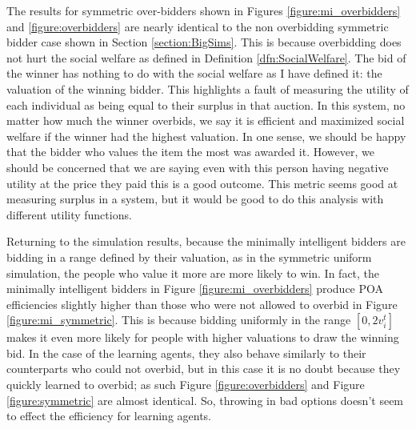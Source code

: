 \documentclass[12pt,twoside]{reedthesis}
\begin{document}
The results for symmetric over-bidders shown in Figures \ref{figure:mi_overbidders} and \ref{figure:overbidders} are nearly identical to the non overbidding symmetric bidder case shown in Section \ref{section:BigSims}. This is because overbidding does not hurt the social welfare as defined in Definition \ref{dfn:SocialWelfare}. The bid of the winner has nothing to do with the social welfare as I have defined it: the valuation of the winning bidder. This highlights a fault of measuring the utility of each individual as being equal to their surplus in that auction. In this system, no matter how much the winner overbids, we say it is efficient and maximized social welfare if the winner had the highest valuation. In one sense, we should be happy that the bidder who values the item the most was awarded it. However, we should be concerned that we are saying even with this person having negative utility at the price they paid this is a good outcome. This metric seems good at measuring surplus in a system, but it would be good to do this analysis with different utility functions. 

Returning to the simulation results, because the minimally intelligent bidders are bidding in a range defined by their valuation, as in the symmetric uniform simulation, the people who value it more are more likely to win. In fact, the minimally intelligent bidders in Figure \ref{figure:mi_overbidders} produce POA efficiencies slightly higher than those who were not allowed to overbid in Figure \ref{figure:mi_symmetric}. This is because bidding uniformly in the range $[0, 2v_i^t]$ makes it even more likely for people with higher valuations to draw the winning bid. In the case of the learning agents, they also behave similarly to their counterparts who could not overbid, but in this case it is no doubt because they quickly learned to overbid; as such Figure \ref{figure:overbidders} and Figure \ref{figure:symmetric} are almost identical. So, throwing in bad options doesn't seem to effect the efficiency for learning agents.
\end{document}
